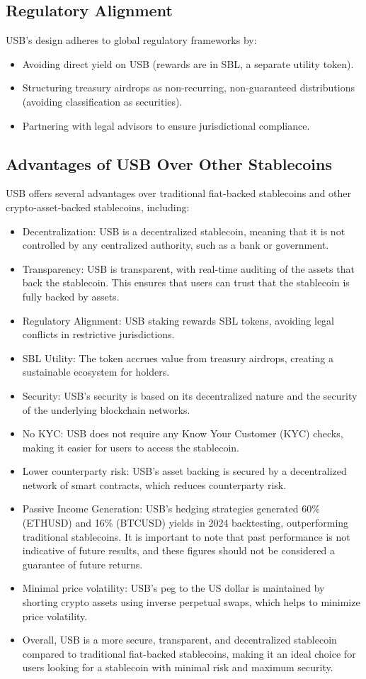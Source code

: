 \subsection{Regulatory Alignment}  
USB’s design adheres to global regulatory frameworks by:  
\begin{itemize}  
\item Avoiding direct yield on USB (rewards are in SBL, a separate utility token).  
\item Structuring treasury airdrops as non-recurring, non-guaranteed distributions (avoiding classification as securities).  
\item Partnering with legal advisors to ensure jurisdictional compliance.  
\end{itemize}  

\subsection{Advantages of USB Over Other Stablecoins}
USB offers several advantages over traditional fiat-backed stablecoins and other crypto-asset-backed stablecoins, including:
\begin{itemize}
\item Decentralization: USB is a decentralized stablecoin, meaning that it is not controlled by any centralized authority, such as a bank or government.
\item Transparency: USB is transparent, with real-time auditing of the assets that back the stablecoin. This ensures that users can trust that the stablecoin is fully backed by assets.
\item Regulatory Alignment: USB staking rewards SBL tokens, avoiding legal conflicts in restrictive jurisdictions.
\item SBL Utility: The token accrues value from treasury airdrops, creating a sustainable ecosystem for holders.
\item Security: USB's security is based on its decentralized nature and the security of the underlying blockchain networks.
\item No KYC: USB does not require any Know Your Customer (KYC) checks, making it easier for users to access the stablecoin.
\item Lower counterparty risk: USB's asset backing is secured by a decentralized network of smart contracts, which reduces counterparty risk.
\item Passive Income Generation: USB's hedging strategies generated 60\% (ETHUSD) and 16\% (BTCUSD) yields in 2024 backtesting, outperforming traditional stablecoins. It is important to note that past performance is not indicative of future results, and these figures should not be considered a guarantee of future returns.
\item Minimal price volatility: USB's peg to the US dollar is maintained by shorting crypto assets using inverse perpetual swaps, which helps to minimize price volatility.
\item Overall, USB is a more secure, transparent, and decentralized stablecoin compared to traditional fiat-backed stablecoins, making it an ideal choice for users looking for a stablecoin with minimal risk and maximum security.
\end{itemize}
